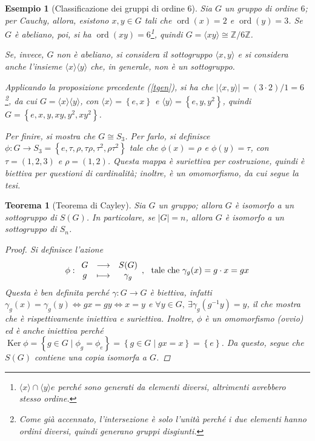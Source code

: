 \documentclass[11pt]{scrartcl}
\theoremstyle{style1}
\newtheorem{teorema}{Teorema}[section]
\newtheorem{esempio}{Esempio}[section]
\numberwithin{equation}{subsection}
\begin{document}
\begin{esempio}[Classificazione dei gruppi di ordine 6]
Sia $G$ un gruppo di ordine $6$; per Cauchy, allora, esistono $x,y \in G$ tali che $\operatorname{ord}(x) = 2$ e $\operatorname{ord}(y) =3$. 
Se $G$ \`e abeliano, poi, si ha $\operatorname{ord}(xy) = 6$\footnote{$\langle x \rangle \cap \langle y \rangle e$ perch\'e sono generati da elementi diversi, altrimenti avrebbero stesso ordine.}, quindi $G = \langle xy \rangle\cong \mathbb{Z}/ 6\mathbb{Z}$.

Se, invece, $G$ non \`e abeliano, si considera il sottogruppo $\langle x,y \rangle$ e si considera anche l'insieme $\langle x \rangle\langle y \rangle$ che, in generale, non \`e un sottogruppo.

Applicando la proposizione precedente (\ref{tgen}), si ha che $\lvert \langle x,y \rangle \rvert = (3 \cdot 2) / 1= 6$\footnote{Come gi\`a accennato, l'intersezione \`e solo l'unit\`a perch\'e i due elementi hanno ordini diversi, quindi generano gruppi disgiunti.}, da cui $G = \langle x \rangle\langle y \rangle$, con $\langle x \rangle= \left\{ e,x \right\} $ e $\langle y \rangle= \left\{ e,y,y^2 \right\} $, quindi $G = \left\{ e , x ,y, xy,y^2 , xy^2 \right\} $.

Per finire, si mostra che $G \cong S_3$. 
Per farlo, si definisce $\phi :G \to S_3=\left\{ e,\tau ,\rho ,\tau \rho ,\tau ^2,\rho \tau ^2 \right\} $ tale che $\phi (x) = \rho $ e $\phi (y) = \tau $, con $\tau =(1,2,3)$ e $\rho = (1,2)$.
Questa mappa \`e suriettiva per costruzione, quindi \`e biettiva per questioni di cardinalit\`a; inoltre, \`e un omomorfismo, da cui segue la tesi.
\end{esempio}

\begin{teorema}
	[Teorema di Cayley]
	Sia $G$ un gruppo; allora $G$ \`e isomorfo a un sottogruppo di $S(G)$.
	In particolare, se $|G| = n$, allora $G$ \`e isomorfo a un sottogruppo di $S_n$.
	\begin{proof}
		Si definisce l'azione
		\[
		\phi : 
		\begin{array}
			{c c c}
			G & \longrightarrow & S(G)\\
			g & \longmapsto & \gamma_g
		\end{array}, \ \text{ tale che } \gamma_g(x) = g\cdot  x=gx
		\] 
		Questa \`e ben definita perch\'e $\gamma:G \to G$ \`e biettiva, infatti $\gamma_g(x) = \gamma_g(y) \iff g x = g y \iff x = y$ e $\forall y \in G , \ \exists \gamma_g(g^{-1} y) = y $, il che mostra che \`e rispettivamente iniettiva e suriettiva.
		Inoltre, $\phi $ \`e un omomorfismo (ovvio) ed \`e anche iniettiva perch\'e $\operatorname{Ker} \phi = \left\{ g \in G  \mid \phi _g = \phi _e \right\} = \left\{ g \in G  \mid g x = x \right\} = \left\{ e \right\}$.
		Da questo, segue che $S(G)$ contiene una copia isomorfa a $G$.
	\end{proof}
\end{teorema}
\end{document}
